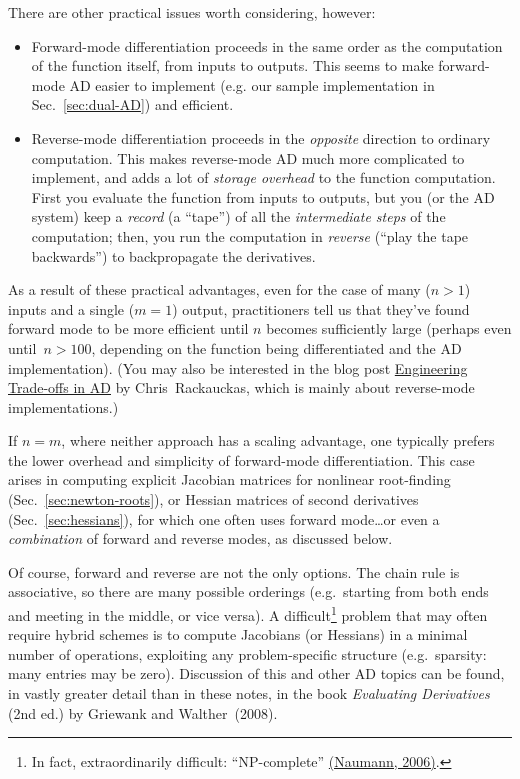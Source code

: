 There are other practical issues worth considering, however:
\begin{itemize}

\item Forward-mode differentiation proceeds in the same order as the computation of the function itself, from inputs to outputs.  This seems to make forward-mode AD easier to implement (e.g. our sample implementation in Sec.~\ref{sec:dual-AD}) and efficient.

\item Reverse-mode differentiation proceeds in the \emph{opposite} direction to ordinary computation.  This makes reverse-mode AD much more complicated to implement, and adds a lot of \emph{storage overhead} to the function computation.  First you evaluate the function from inputs to outputs, but you (or the AD system) keep a \emph{record} (a ``tape'') of all the \emph{intermediate steps} of the computation; then, you run the computation in \emph{reverse} (``play the tape backwards'') to backpropagate the derivatives.

\end{itemize}
As a result of these practical advantages, even for the case of many ($n >1$) inputs and a single ($m = 1$) output, practitioners tell us that they've found forward mode to be more efficient until $n$ becomes sufficiently large (perhaps even until~$n > 100$, depending on the function being differentiated and the AD implementation).  (You may also be interested in the blog post \href{https://www.stochasticlifestyle.com/engineering-trade-offs-in-automatic-differentiation-from-tensorflow-and-pytorch-to-jax-and-julia/}{Engineering Trade-offs in AD} by Chris~Rackauckas, which is mainly about reverse-mode implementations.)

If $n = m$, where neither approach has a scaling advantage, one typically prefers the lower overhead and simplicity of forward-mode differentiation.   This case arises in computing explicit Jacobian matrices for nonlinear root-finding (Sec.~\ref{sec:newton-roots}), or Hessian matrices of second derivatives (Sec.~\ref{sec:hessians}), for which one often uses forward mode\ldots or even a \emph{combination} of forward and reverse modes, as discussed below.  

Of course, forward and reverse are not the only options.  The chain rule is associative, so there are many possible orderings (e.g.~starting from both ends and meeting in the middle, or vice versa).   A difficult\footnote{In fact, extraordinarily difficult: ``NP-complete'' \href{https://dl.acm.org/doi/abs/10.5555/3114201.3114717}{(Naumann, 2006)}.} problem that may often require hybrid schemes is to compute Jacobians (or Hessians) in a minimal number of operations, exploiting any problem-specific structure (e.g.~sparsity: many entries may be zero).  Discussion of this and other AD topics can be found, in vastly greater detail than in these notes, in the book \textit{Evaluating Derivatives} (2nd ed.) by Griewank and Walther~(2008).

